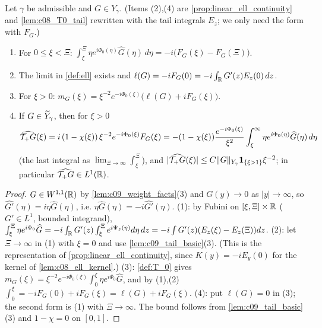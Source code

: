 \begin{lemma}
  \label{lem:c09_tail_formula}
  Let $\gamma$ be admissible and $G\in Y_\gamma$. (Items (2),(4) are \cref{prop:linear_ell_continuity} and \cref{lem:c08_T0_tail}
  rewritten with the tail integrals $E_z$; we only need the form with $F_G$.)
  \begin{enumerate}
    \item For $0\le\xi<\Xi$: $\int_\xi^\Xi\eta e^{i\Phi_0(\eta)}\widehat G(\eta)\,d\eta=-i\bigl(F_G(\xi)-F_G(\Xi)\bigr)$.
    \item The limit in \cref{def:ell} exists and $\ell(G)=-iF_G(0)=-i\int_{\mathbb{R}} G'(z)E_z(0)\,dz$.
    \item For $\xi>0$: $m_G(\xi)=\xi^{-2}e^{-i\Phi_0(\xi)}\bigl(\ell(G)+iF_G(\xi)\bigr)$.
    \item If $G\in\widetilde{Y}_\gamma$, then for $\xi>0$
      \[
        \widehat{\mathcal{T}_+G}(\xi)=i\,(1-\chi(\xi))\,\xi^{-2}e^{-i\Phi_0(\xi)}F_G(\xi)
        =-(1-\chi(\xi))\frac{e^{-i\Phi_0(\xi)}}{\xi^2}\int_\xi^\infty\eta e^{i\Phi_0(\eta)}\widehat G(\eta)\,d\eta
      \]
      (the last integral as $\lim_{\Xi\to\infty}\int_\xi^\Xi$), and $|\widehat{\mathcal{T}_+G}(\xi)|\le C\|G\|_{Y_\gamma}\mathbf 1_{\{\xi>1\}}\xi^{-2}$; in particular $\widehat{\mathcal{T}_+G}\in L^1(\mathbb{R})$.
  \end{enumerate}
\end{lemma}
\begin{proof}
  $G\in W^{1,1}(\mathbb{R})$ by \cref{lem:c09_weight_facts}(3) and $G(y)\to0$ as $|y|\to\infty$, so $\widehat{G'}(\eta)=i\eta\widehat G(\eta)$, i.e.
  $\eta\widehat G(\eta)=-i\widehat{G'}(\eta)$. (1): by Fubini on $[\xi,\Xi]\times\mathbb{R}$ ($G'\in L^1$, bounded integrand),
  $\int_\xi^\Xi\eta e^{i\Phi_0}\widehat G=-i\int_{\mathbb{R}} G'(z)\int_\xi^\Xi e^{i\Psi_z(\eta)}d\eta\,dz=-i\int G'(z)(E_z(\xi)-E_z(\Xi))dz$.
  (2): let $\Xi\to\infty$ in (1) with $\xi=0$ and use \cref{lem:c09_tail_basic}(3). (This is the representation of
  \cref{prop:linear_ell_continuity}, since $K(y)=-iE_y(0)$ for the kernel of \cref{lem:c08_ell_kernel}.)
  (3): \cref{def:T_0} gives $m_G(\xi)=\xi^{-2}e^{-i\Phi_0(\xi)}\int_0^\xi\eta e^{i\Phi_0}\widehat G$, and by (1),(2)
  $\int_0^\xi=-iF_G(0)+iF_G(\xi)=\ell(G)+iF_G(\xi)$.
  (4): put $\ell(G)=0$ in (3); the second form is (1) with $\Xi\to\infty$. The bound follows from
  \cref{lem:c09_tail_basic}(3) and $1-\chi=0$ on $[0,1]$.
\end{proof}

